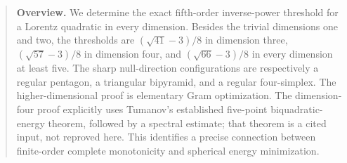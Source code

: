 \documentclass[11pt,a4paper]{article}
\theoremstyle{definition}\newtheorem{definition}[theorem]{Definition}
\theoremstyle{remark}\newtheorem{remark}[theorem]{Remark}
\numberwithin{equation}{section}
\begin{document}
\begin{quote}\small\textbf{Overview.} We determine the exact fifth-order inverse-power threshold for a Lorentz quadratic in every dimension. Besides the trivial dimensions one and two, the thresholds are $(\sqrt{41}-3)/8$ in dimension three, $(\sqrt{57}-3)/8$ in dimension four, and $(\sqrt{66}-3)/8$ in every dimension at least five. The sharp null-direction configurations are respectively a regular pentagon, a triangular bipyramid, and a regular four-simplex. The higher-dimensional proof is elementary Gram optimization. The dimension-four proof explicitly uses Tumanov's established five-point biquadratic-energy theorem, followed by a spectral estimate; that theorem is a cited input, not reproved here. This identifies a precise connection between finite-order complete monotonicity and spherical energy minimization.\end{quote}
\end{document}
